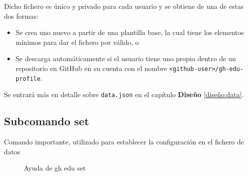 Dicho fichero es único y privado para cada usuario y se obtiene de una de estas dos formas:
\begin{itemize}
    \item Se crea uno nuevo a partir de una plantilla base, la cual tiene los elementos mínimos para dar el fichero por válido, o 
    \item Se descarga automáticamente si el usuario tiene uno propio dentro de un repositorio en GitHub en su cuenta con el nombre \verb|<github-user>/gh-edu-profile|. 
\end{itemize}

Se entrará más en detalle sobre \verb|data.json| en el capítulo \textbf{Diseño} \ref{diseño:data}.

\subsection{Subcomando set}
Comando importante, utilizado para establecer la configuración en el fichero de datos
\begin{figure}[h]
    \centering
    \caption{Ayuda de gh edu set}
    \label{fig:ghEduSetHelp}
\end{figure}

